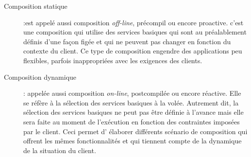       \SpecialItem
      \begin{description}
      \item[Composition statique] :est appelé aussi composition
        \textit{off-line}, précompil ou encore proactive. c'est une
        composition qui utilise des services basiques qui sont au
        préalablement définis d'une façon figée et qui ne peuvent pas
        changer en fonction du contexte du client. Ce type de
        composition engendre des applications peu flexibles, parfois
        inappropriées avec les exigences des clients.


      \item[Composition dynamique]: appelée aussi composition
        \textit{on-line}, postcompilée ou encore réactive. Elle se
        réfère à la sélection des services basiques à la
        volée. Autrement dit, la sélection des services basiques ne
        peut pas être définie à l'avance mais elle sera faite au
        moment de l'exécution en fonction des contraintes imposées par
        le client. Ceci permet d' élaborer différents scénario de
        composition qui offrent les mêmes fonctionnalités et qui
        tiennent compte de la dynamique de la situation du client.


\end{description}
